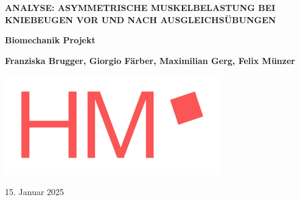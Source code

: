 
\begin{titlepage}
   \begin{center}
       \vspace*{1cm}

       \Huge
       \textbf{
         ANALYSE: ASYMMETRISCHE MUSKELBELASTUNG BEI KNIEBEUGEN VOR UND NACH AUSGLEICHSÜBUNGEN
       }

       \vspace{0.5cm}
       \LARGE

       \vspace{1.5cm}

       \textbf{Biomechanik Projekt}
       \vfill

       \textbf{Franziska Brugger, Giorgio Färber, Maximilian Gerg, Felix Münzer}
       \vfill

       \begin{center}
         \includegraphics[width=0.7\textwidth]{img/hm-logo.jpg}
         \\
         \normalsize
       \end{center}


       \vfill


       \Large


       \vspace{0.8cm}
       \centering

       15. Januar 2025



   \end{center}
 \end{titlepage}